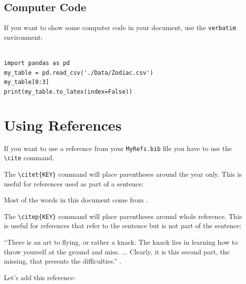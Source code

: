 \documentclass[twocolumn]{aastex701}
\begin{document}
\subsection{Computer Code}

If you want to show some computer code in your document, use the \texttt{verbatim} environment:

\begin{verbatim}

import pandas as pd
my_table = pd.read_csv('./Data/Zodiac.csv')
my_table[0:3]
print(my_table.to_latex(index=False))

\end{verbatim}

\clearpage       %

\onecolumngrid   %

\section{Using References}

If you want to use a reference from your \texttt{MyRefs.bib} file you have to use the \texttt{\textbackslash cite} command.

\vspace{1em}

The \texttt{\textbackslash citet\{KEY\}} command will place parentheses around the year only. This is useful for references used as part of a sentence:

\vspace{1em}

Most of the words in this document come from \citet{1983Sci...220.1339R}.

\vspace{1em}

The \texttt{\textbackslash citep\{KEY\}} command will place parentheses around whole reference. This is useful for references that refer to the sentence but is not part of the sentence:

\vspace{1em}

``There is an art to flying, or rather a knack. The knack lies in learning how to throw yourself at the ground and miss. ... Clearly, it is this second part, the missing, that presents the difficulties.''
 \citep{adams1979hitchhiker}.
 
\vspace{1cm}

Let's add this reference: 




\end{document}
